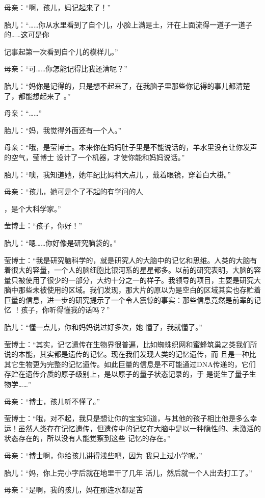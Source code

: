 \documentclass{article}
\begin{document}
母亲：“啊，孩儿，妈记起来了！” 

胎儿：“……你从水里看到了自个儿，小脸上满是土，汗在上面流得一道子一道子的……这可是你
\newpage

记事起第一次看到自个儿的模样儿。” 


母亲：“可……你怎能记得比我还清呢？” 

胎儿：“妈你是记得的，只是想不起来了，在我脑子里那些你记得的事儿都清楚了，都能想起来了
。” 


母亲：“……” 


胎儿：“妈，我觉得外面还有一个人。” 

母亲：“哦，是莹博士。本来你在妈妈肚子里是不能说话的，羊水里没有让你发声的空气，莹博士
设计了一个机器，才使你能和妈妈说话。” 

胎儿：“噢，我知道她，她年纪比妈稍大点儿
，戴着眼镜，穿着白大褂。” 

母亲：“孩儿，她可是个了不起的有学问的人

\newpage
，是个大科学家。” 


莹博士：“孩子，你好！” 


胎儿：“嗯……你好像是研究脑袋的。” 

莹博士：“我是研究脑科学的，就是研究人的大脑中的记忆和思维。人类的大脑有着很大的容量，一个人的脑细胞比银河系的星星都多。以前的研究表明，大脑的容量只被使用了很少的一部分，大约十分之一的样子。我领导的项目，主要是研究大脑中那些未被使用的区域。我们发现，那大片的原以为是空白的区域其实也存贮着巨量的信息，进一步的研究提示了一个令人震惊的事实：那些信息竟然是前辈的记忆
！孩子，你听得懂我的话吗？” 

胎儿：“懂一点儿，你和妈妈说过好多次，她
懂了，我就懂了。” 

莹博士：“其实，记忆遗传在生物界很普遍，比如蜘蛛织网和蜜蜂筑巢之类我们所说的本能，其实都是遗传的记忆。现在我们发现人类的记忆遗传，而
\newpage
且是一种比其它生物更为完整的记忆遗传。如此巨量的信息是不可能通过DNA传递的，它们存贮在遗传介质的原子级别上，是以原子的量子状态记录的，于
是诞生了量子生物学……” 


母亲：“博士，孩儿听不懂了。” 

莹博士：“哦，对不起，我只是想让你的宝宝知道，与其他的孩子相比他是多么幸运！虽然人类存在记忆遗传，但遗传中的记忆在大脑中是以一种隐性的、未激活的状态存在的，所以没有人能觉察到这些
记忆的存在。” 

母亲：“博士啊，你给孩儿讲得浅些吧，因为
我只上过小学呢。” 

胎儿：“妈，你上完小字后就在地里干了几年
活儿，然后就一个人出去打工了。” 

母亲：“是啊，我的孩儿，妈在那连水都是苦
\end{document}
